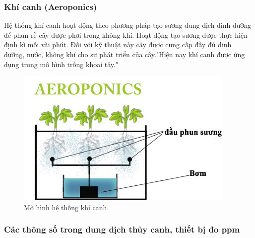 \documentclass[a4paper,12pt,oneside]{article}
\begin{document}
\subsubsection{Khí canh (Aeroponics)}

\noindent Hệ thống khí canh hoạt động theo phương pháp tạo sương dung dịch dinh dưỡng để phun rễ cây được phơi trong không khí. Hoạt động tạo sương được thực hiện định kì mỗi vài phút. Đối với kỹ thuật này cây được cung cấp đầy đủ dinh dưỡng, nước, không khí cho sự phát triển của cây."Hiện nay khí canh được ứng dụng trong mô hình trồng khoai tây."\cite{thuycanh}


\begin{figure}[H]
	\centering
	\includegraphics[scale=.9]{hinh/aeroponics.jpg}
	\caption{Mô hình hệ thống khí canh\cite{thuycanh}.}
	\label{fig:aeroponics}
\end{figure}


\subsubsection{Các thông số trong dung dịch thủy canh, thiết bị đo ppm}
\end{document}
